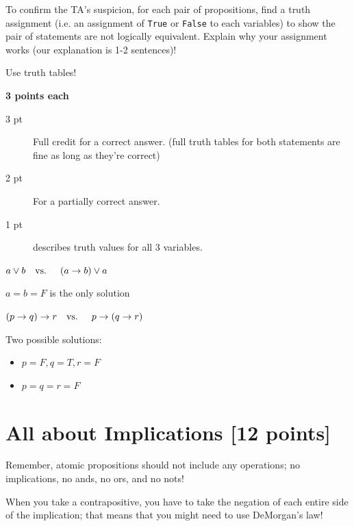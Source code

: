 \documentclass[homework, problems]{../../latex-common/cs151-common}
\begin{document}
\begin{problemsonly}
To confirm the TA's suspicion, for each pair of propositions, find a truth assignment (i.e. an assignment of \texttt{True} or \texttt{False} to each variables) to show the pair of statements are not logically equivalent. Explain why your assignment works (our explanation is 1-2 sentences)! \\
\end{problemsonly}

\begin{hint}
Use truth tables!
\end{hint}

\begin{rubric}
\textbf{3 points each}
\begin{description}
    \item[3 pt] Full credit for a correct answer. (full truth tables for both statements are fine as long as they're correct)
    \item[2 pt] For a partially correct answer.
    \item[1 pt] describes truth values for all 3 variables.
\end{description}
\end{rubric}

\begin{enumeratequestions}
    \item $a \lor b \text{\quad vs. \quad} (a \rightarrow b) \lor a$

    \begin{solution}
        $a = b = F$ is the only solution
    \end{solution}
    
    \item $(p \rightarrow q) \rightarrow r  \text{\quad vs. \quad} p \rightarrow (q \rightarrow r)$ 

    \begin{solution}
        Two possible solutions:
        \begin{itemize}
            \item $p=F, q=T, r=F$
            \item $p = q = r = F$
        \end{itemize}
    \end{solution}
\end{enumeratequestions}

\section{All about Implications \hfill [12 points]}
\begin{hint}
    Remember, atomic propositions should not include any operations; no implications, no ands, no ors, and no nots!

    When you take a contrapositive, you have to take the negation of each entire side of the implication; that means that you might need to use DeMorgan's law!
\end{hint}
\end{document}
